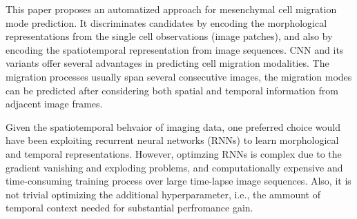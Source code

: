 \documentclass{article}
\begin{document}
This paper proposes an automatized approach for mesenchymal 
cell migration mode prediction. It discriminates candidates by encoding the morphological representations 
from the single cell observations (image patches), and also by encoding the spatiotemporal 
representation from image sequences.  CNN and its variants offer 
several advantages in predicting cell migration modalities. The migration processes usually span 
several consecutive images, the migration modes can be predicted after considering both spatial and 
temporal information from adjacent image frames. 

Given the spatiotemporal behvaior of imaging data, one preferred choice would have been exploiting recurrent 
neural networks (RNNs) to learn morphological and temporal representations. 
However, optimzing RNNs is complex due to the gradient vanishing and exploding problems, and computationally expensive 
and time-consuming training process over large time-lapse image sequences. 
Also, it is not trivial optimizing the additional hyperparameter, i.e., the ammount of temporal context needed
for substantial perfromance gain. 


\end{document}
